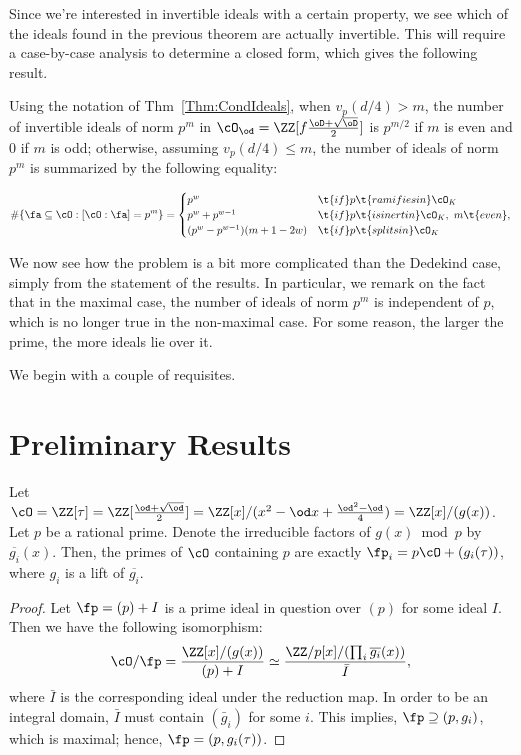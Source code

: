 \documentclass[11pt, proquest]{uwthesis}
\begin{document}
Since we're interested in invertible ideals with a certain property, we see which of the ideals found in the previous theorem are actually invertible.
This will require a case-by-case analysis to determine a closed form, which gives the following result.
\begin{corollary}\label{Cor:InveribleIdeals}Using the notation of Thm~\ref{Thm:CondIdeals}, when $v_p(d/4)>m$, the number of invertible ideals of norm $p^m$ in $\cO_\od = \ZZ[f\frac{\oD + \sqrt{\oD}}{2}]$ is $p^{m/2}$ if $m$ is even and $0$ if $m$ is odd; otherwise, assuming $v_p(d/4) \leq m$, the number of ideals of norm $p^m$  is summarized by the following equality:

  \[\#\{\fa\subseteq \cO: [\cO:\fa] = p^m\} =
    \begin{cases}
      p^w                      & \t{if } p \t{ ramifies in } \cO_K\\
      p^w + p^{w-1}            & \t{if } p \t{ is inert in } \cO_K,~ m \t{ even}, \\
      (p^w - p^{w -1})(m+1-2w) & \t{if } p \t{ splits in } \cO_K
    \end{cases}
  \]
\end{corollary}

We now see how the problem is a bit more complicated than the Dedekind case, simply from the statement of the results.
In particular, we remark on the fact that in the maximal case, the number of ideals of norm $p^m$ is independent of $p$, which is no longer true in the non-maximal case.
For some reason, the larger the prime, the more ideals lie over it.

We begin with a couple of requisites.

\section{Preliminary Results}\label{Prelims:Sec}

\begin{proposition}\label{prop:OPrimes}
  Let $\cO = \ZZ[\tau] = \ZZ[\frac{\od+\sqrt{\od}}{2}] = \ZZ[x]/(x^2-\od x+\frac{\od^2-\od}{4}) = \ZZ[x]/(g(x))$.  Let $p$ be a rational prime.
  Denote the irreducible factors of $g(x)\bmod p$ by $\overline{g_i}(x)$. Then, the primes of $\cO$ containing $p$ are exactly $\fp_i = p\cO + (g_i(\tau))$, where $g_i$ is a lift of $\overline{g_i}$.
\end{proposition}

\begin{proof}
  Let $\fp = (p) + I$ is a prime ideal in question over $(p)$ for some ideal $I$. Then we have the following isomorphism:
  \[
    \cO/\fp = \frac{\ZZ[x]/(g(x))}{(p)+I}\simeq \frac{\ZZ/p[x]/(\prod_i \overline {g_i}(x))}{\bar I},
  \]
  where $\bar I$ is the corresponding ideal under the reduction map.
  In order to be an integral domain, $\bar I$ must contain $(\bar g_i)$ for some $i$. This implies, $\fp \supseteq (p,g_i)$, which is maximal; hence, $\fp = (p,g_i(\tau))$.
\end{proof}
\end{document}
